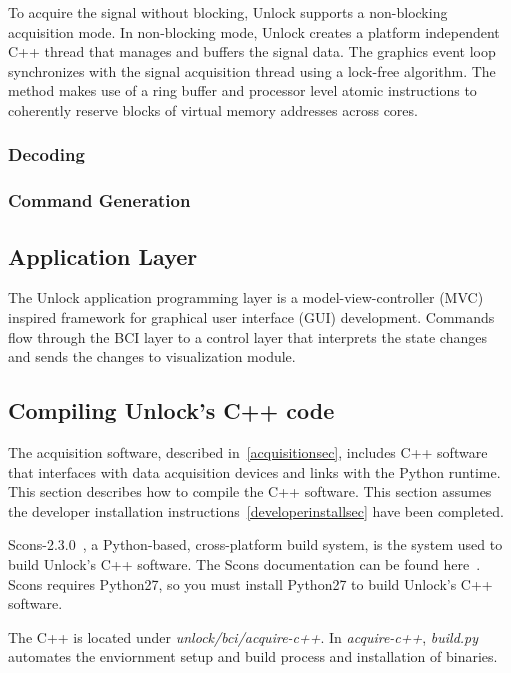 \documentclass[11pt]{article}
\begin{document}
To acquire the signal without blocking, Unlock supports a non-blocking acquisition mode.  In non-blocking mode, Unlock creates a platform independent C++ thread that manages and buffers the signal data.  The graphics event loop synchronizes with the signal acquisition thread using a lock-free algorithm.  The method makes use of a ring buffer and processor level atomic instructions to coherently reserve blocks of virtual memory addresses across cores.

\subsubsection{Decoding}

\subsubsection{Command Generation}

\subsection{Application Layer}\label{applicationsec}

The Unlock application programming layer is a model-view-controller (MVC)~\cite{mvc, mvc2} inspired framework for graphical user interface (GUI) development.  Commands flow through the BCI layer to a control layer that interprets the state changes and sends the changes to visualization module.

\subsection{Compiling Unlock's C++ code}

The acquisition software, described in~\ref{acquisitionsec}, includes C++ software that interfaces with data acquisition devices and links with the Python runtime.  This section describes how to compile the C++ software.  This section assumes the developer installation instructions~\ref{developerinstallsec} have been completed.  

Scons-2.3.0~\cite{scons}, a Python-based, cross-platform build system, is the system used to build Unlock's C++ software.  The Scons documentation can be found here~\cite{sconsdocs}.  Scons requires Python27, so you must install Python27 to build Unlock's C++ software.

The C++ is located under \textit{unlock/bci/acquire-c++}.   In \textit{acquire-c++}, \textit{build.py} automates the enviornment setup and build process and installation of binaries.
\end{document}

